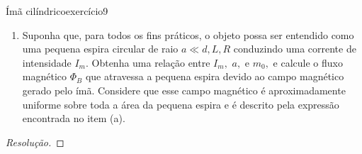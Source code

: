 \begin{exercício}{Ímã cilíndrico}{exercício9}
\begin{enumerate}[label=(\alph*)]
\begin{center}
    \end{center}
        \item Suponha que, para todos os fins práticos, o objeto possa ser entendido como uma pequena espira circular de raio \(a \ll d, L, R\) conduzindo uma corrente de intensidade \(I_m\). Obtenha uma relação entre \(I_m,\) \(a,\) e \(m_0,\) e calcule o fluxo magnético \(\Phi_B\) que atravessa a pequena espira devido ao campo magnético gerado pelo ímã. Considere que esse campo magnético é aproximadamente uniforme sobre toda a área da pequena espira e é descrito pela expressão encontrada no item (a).
    \end{enumerate}

\end{exercício}
\begin{proof}[Resolução]
\end{proof}
